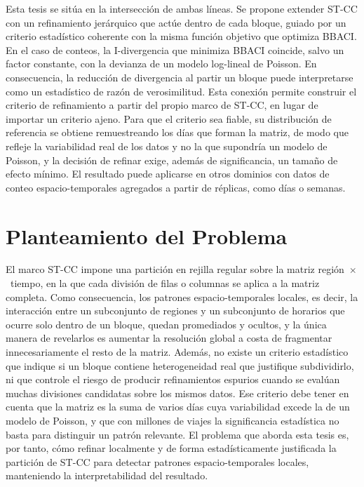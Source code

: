 Esta tesis se sitúa en la intersección de ambas líneas. Se propone extender
\ac{ST-CC} con un refinamiento jerárquico que actúe dentro de cada
bloque, guiado por un criterio estadístico coherente con la misma función
objetivo que optimiza \ac{BBACI}. En el caso de conteos, la I-divergencia
que minimiza \ac{BBACI} coincide, salvo un factor constante, con la
devianza de un modelo log-lineal de Poisson. En consecuencia, la reducción
de divergencia al partir un bloque puede interpretarse como un estadístico
de razón de verosimilitud. Esta conexión permite construir el criterio de
refinamiento a partir del propio marco de \ac{ST-CC}, en lugar de importar
un criterio ajeno. Para que el criterio sea fiable, su distribución de
referencia se obtiene remuestreando los días que forman la matriz, de modo que
refleje la variabilidad real de los datos y no la que supondría un modelo de
Poisson, y la decisión de refinar exige, además de significancia, un tamaño de
efecto mínimo. El resultado puede aplicarse en otros dominios con datos de
conteo espacio-temporales agregados a partir de réplicas, como días o semanas.

\section{Planteamiento del Problema}
\label{sec:problema}

El marco \ac{ST-CC} impone una partición en rejilla regular sobre la matriz
región~$\times$~tiempo, en la que cada división de filas o columnas se
aplica a la matriz completa. Como consecuencia, los patrones
espacio-temporales locales, es decir, la interacción entre un
subconjunto de regiones y un subconjunto de horarios que ocurre solo dentro
de un bloque, quedan promediados y ocultos, y la única manera de revelarlos
es aumentar la resolución global a costa de fragmentar innecesariamente el
resto de la matriz. Además, no existe un criterio estadístico que indique
si un bloque contiene heterogeneidad real que justifique subdividirlo, ni
que controle el riesgo de producir refinamientos espurios cuando se evalúan
muchas divisiones candidatas sobre los mismos datos. Ese criterio debe tener
en cuenta que la matriz es la suma de varios días cuya variabilidad excede la
de un modelo de Poisson, y que con millones de viajes la significancia
estadística no basta para distinguir un patrón relevante. El problema que aborda
esta tesis es, por tanto, cómo refinar localmente y de forma
estadísticamente justificada la partición de \ac{ST-CC} para detectar
patrones espacio-temporales locales, manteniendo la interpretabilidad del
resultado.

